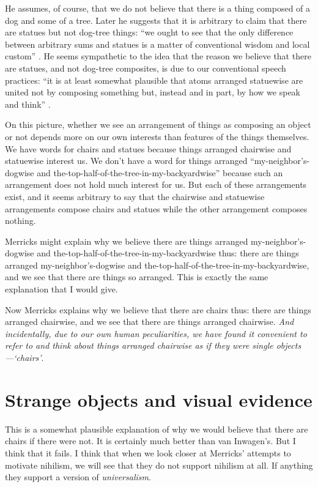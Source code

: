 \documentclass[11pt]{article}
\begin{document}
\begin{spacing}{1.25}
He assumes, of course, that we do not believe that there is a thing
composed of a dog and some of a tree.  Later he suggests that it is
arbitrary to claim that there are statues but not dog-tree things:
``we ought to see that the only difference between arbitrary sums and
statues is a matter of conventional wisdom and local custom''
\citeyearpar[75]{merricks2001a}.  He seems sympathetic to the idea
that the reason we believe that there are statues, and not dog-tree
composites, is due to our conventional speech practices: ``it is at
least somewhat plausible that atoms arranged statuewise are united not
by composing something but, instead and in part, by how we speak and
think'' \citeyearpar[121]{merricks2001a}.

On this picture, whether we see an arrangement of things as composing
an object or not depends more on our own interests than features of
the things themselves.  We have words for chairs and statues because
things arranged chairwise and statuewise interest us.  We don't have a
word for things arranged ``my-neighbor's-dogwise and
the-top-half-of-the-tree-in-my-backyardwise'' because such an
arrangement does not hold much interest for us.  But each of these
arrangements exist, and it seems arbitrary to say that the chairwise
and statuewise arrangements compose chairs and statues while the other
arrangement composes nothing.

Merricks might explain why we believe there are things arranged
my-neighbor's-dogwise and the-top-half-of-the-tree-in-my-backyardwise
thus: there are things arranged my-neighbor's-dogwise and
the-top-half-of-the-tree-in-my-backyardwise, and we see that there are
things so arranged.  This is exactly the same explanation that I would
give.

Now Merricks explains why we believe that there are chairs thus: there
are things arranged chairwise, and we see that there are things
arranged chairwise.  {\em And incidentally, due to our own human
  peculiarities, we have found it convenient to refer to and think
  about things arranged chairwise as if they were single
  objects---`chairs'}.

\section{Strange objects and visual evidence}
\label{dogbush}
This is a somewhat plausible explanation of why we would believe that
there are chairs if there were not.  It is certainly much better than
van Inwagen's.  But I think that it fails.  I think that when we look
closer at Merricks' attempts to motivate nihilism, we will see that
they do not support nihilism at all.  If anything they support a
version of {\em universalism}.


\end{spacing}
\end{document}
